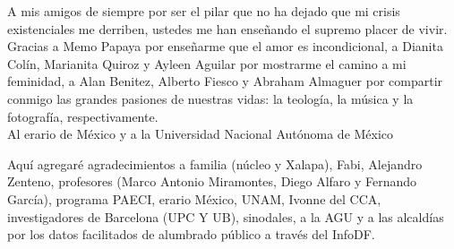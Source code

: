 A mis amigos de siempre por ser el pilar que no ha dejado que mi crisis existenciales me derriben, ustedes me han enseñando el supremo placer de vivir. Gracias a Memo Papaya por enseñarme que el amor es incondicional, a Dianita Colín, Marianita Quiroz y Ayleen Aguilar por mostrarme el camino a mi feminidad, a Alan Benitez, Alberto Fiesco y Abraham Almaguer por compartir conmigo las grandes pasiones de nuestras vidas: la teología, la música y la fotografía, respectivamente.\\

Al erario de México y a la Universidad Nacional Autónoma de México 

Aquí agregaré agradecimientos a familia (núcleo y Xalapa), Fabi, Alejandro Zenteno, profesores (Marco Antonio Miramontes, Diego Alfaro y Fernando García), programa PAECI, erario México, UNAM, Ivonne del CCA, investigadores de Barcelona (UPC Y UB), sinodales, a la AGU y a las alcaldías por los datos facilitados de alumbrado público a través del InfoDF.